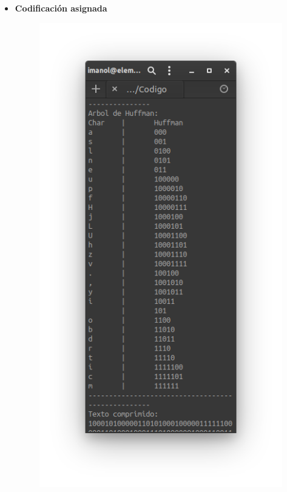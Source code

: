 \begin{itemize}
\begin{figure}[h!]
                \end{figure}
                \newpage
            \item \textbf{Codificación asignada} \\
                \begin{figure}[h!]
                    \centering
                    \includegraphics[scale=.5]{Huffman/ejemplos/ejemplo2/ej2-reph.png}
                \end{figure}
                \newpage
        \end{itemize}

